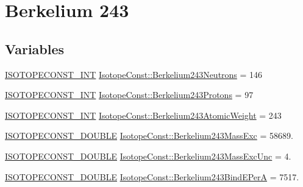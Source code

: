 \hypertarget{group___isotope_const-_berkelium-_bk243}{}\section{Berkelium 243}
\label{group___isotope_const-_berkelium-_bk243}
\subsection*{Variables}
\begin{DoxyCompactItemize}
\item 
\mbox{\hyperlink{group___isotope_const-_macros_ga5f18360b3e99483a35c32d789e62621c}{I\+S\+O\+T\+O\+P\+E\+C\+O\+N\+S\+T\+\_\+\+I\+NT}} \mbox{\hyperlink{group___isotope_const-_berkelium-_bk243_ga763213bf7d6c3b76aeb6a92856cf2d30}{Isotope\+Const\+::\+Berkelium243\+Neutrons}} = 146
\item 
\mbox{\hyperlink{group___isotope_const-_macros_ga5f18360b3e99483a35c32d789e62621c}{I\+S\+O\+T\+O\+P\+E\+C\+O\+N\+S\+T\+\_\+\+I\+NT}} \mbox{\hyperlink{group___isotope_const-_berkelium-_bk243_ga81771c56005736af613b620d75fef6fe}{Isotope\+Const\+::\+Berkelium243\+Protons}} = 97
\item 
\mbox{\hyperlink{group___isotope_const-_macros_ga5f18360b3e99483a35c32d789e62621c}{I\+S\+O\+T\+O\+P\+E\+C\+O\+N\+S\+T\+\_\+\+I\+NT}} \mbox{\hyperlink{group___isotope_const-_berkelium-_bk243_ga193f8ee375580a6974476e648e61f01b}{Isotope\+Const\+::\+Berkelium243\+Atomic\+Weight}} = 243
\item 
\mbox{\hyperlink{group___isotope_const-_macros_ga8f45a7272ce02c0b4c65c44636ed719a}{I\+S\+O\+T\+O\+P\+E\+C\+O\+N\+S\+T\+\_\+\+D\+O\+U\+B\+LE}} \mbox{\hyperlink{group___isotope_const-_berkelium-_bk243_ga053886401dcf205c76dc3679370decd6}{Isotope\+Const\+::\+Berkelium243\+Mass\+Exc}} = 58689.
\item 
\mbox{\hyperlink{group___isotope_const-_macros_ga8f45a7272ce02c0b4c65c44636ed719a}{I\+S\+O\+T\+O\+P\+E\+C\+O\+N\+S\+T\+\_\+\+D\+O\+U\+B\+LE}} \mbox{\hyperlink{group___isotope_const-_berkelium-_bk243_ga6fbe1a3ac983ab6b5d441f6eea6a4fa4}{Isotope\+Const\+::\+Berkelium243\+Mass\+Exc\+Unc}} = 4.
\item 
\mbox{\hyperlink{group___isotope_const-_macros_ga8f45a7272ce02c0b4c65c44636ed719a}{I\+S\+O\+T\+O\+P\+E\+C\+O\+N\+S\+T\+\_\+\+D\+O\+U\+B\+LE}} \mbox{\hyperlink{group___isotope_const-_berkelium-_bk243_ga983efdf091ecaf7e9a083b60e50a5076}{Isotope\+Const\+::\+Berkelium243\+Bind\+E\+PerA}} = 7517.
\item 

\end{DoxyCompactItemize}
